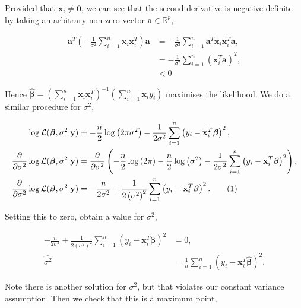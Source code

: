 \documentclass[honours,12pt]{unswthesis}
\newcommand{\s}{\sum_{i=1}^{n}}
\newcommand\numberthis{\addtocounter{equation}{1}\tag{\theequation}}
\numberwithin{equation}{section}
\begin{document}
\noindent Provided that $\mathbf{x}_{i} \neq \mathbf{0}$, we can see that the second derivative is negative definite by taking an arbitrary non-zero vector $\mathbf{a} \in \mathbb{R}^{p}$,

\begin{align*}
	\mathbf{a}^{T} \left(  -\frac{1}{\sigma^{2}} \s \mathbf{x}_{i} \mathbf{x}_{i}^{T} \right) \mathbf{a} &= -\frac{1}{\sigma^{2}} \s \mathbf{a}^{T} \mathbf{x}_{i} \mathbf{x}_{i}^{T} \mathbf{a},\\
	&= -\frac{1}{\sigma^{2}} \s \left( \mathbf{x}_{i}^{T} \mathbf{a} \right)^{2},\\
	&< 0
\end{align*}

\noindent Hence $\hat{\bm{\beta}} = \left( \s \mathbf{x}_{i} \mathbf{x}_{i}^{T} \right)^{-1} \left( \s \mathbf{x}_{i}y_{i} \right)$ maximises the likelihood. We do a similar procedure for $\sigma^{2}$,

\begin{align*} 
	\log\mathcal{L}(\bm{\beta},\sigma^{2} | \mathbf{y}) &= -\frac{n}{2}\log\left(2 \pi \sigma^{2}\right) - \frac{1}{2\sigma^{2}}\sum_{i=1}^{n}\left( y_{i} - \mathbf{x}_{i}^{T}\bm{\beta} \right)^{2},\\
	\frac{\partial}{\partial \sigma^{2}} \log\mathcal{L}(\bm{\beta},\sigma^{2} | \mathbf{y})  &= \frac{\partial}{\partial \sigma^{2}} \left(-\frac{n}{2}\log\left(2 \pi\right)  - \frac{n}{2}\log \left( \sigma^{2}\right)- \frac{1}{2\sigma^{2}}\sum_{i=1}^{n}\left( y_{i} - \mathbf{x}_{i}^{T}\bm{\beta} \right)^{2} \right),\\
	\frac{\partial}{\partial \sigma^{2}} \log\mathcal{L}(\bm{\beta},\sigma^{2} | \mathbf{y}) &= -\frac{n}{2\sigma^{2}} + \frac{1}{2\left( \sigma^{2}\right)^{2}}\s \left( y_{i} - \mathbf{x}_{i}^{T}\bm{\beta} \right)^{2}. \numberthis \label{partialsig1}
\end{align*}

\noindent Setting this to zero, obtain a value for $\sigma^{2}$,

\begin{align*}
	-\frac{n}{2\sigma^{2}} + \frac{1}{2\left( \sigma^{2}\right)^{2}}\s \left( y_{i} - \mathbf{x}_{i}^{T}\bm{\beta} \right)^{2} &= 0,\\
	\widehat{\sigma^{2}} &= \frac{1}{n} \s \left( y_{i} - \mathbf{x}_{i}^{T}\hat{\bm{\beta}} \right)^{2}.
\end{align*}

\noindent Note there is another solution for $\sigma^{2}$, but that violates our constant variance assumption. Then we check that this is a maximum point,
\end{document}
